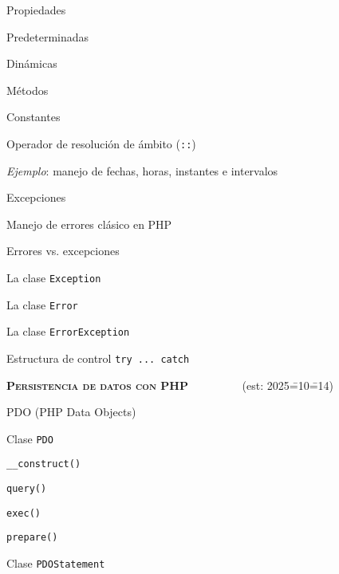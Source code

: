 \begin{longenum}
\begin{longenum}
        \item Propiedades
        \begin{longenum}
            \item Predeterminadas
            \item Dinámicas
        \end{longenum}
        \item Métodos
        \item Constantes
        \begin{longenum}
            \item Operador de resolución de ámbito (\texttt{::})
        \end{longenum}
        \item \textit{Ejemplo}: manejo de fechas, horas, instantes e intervalos
        \item Excepciones
        \begin{longenum}
            \item Manejo de errores clásico en PHP
            \item Errores vs. excepciones
            \item La clase \texttt{Exception}
            \item La clase \texttt{Error}
            \item La clase \texttt{ErrorException}
            \item Estructura de control \texttt{try ... catch}
        \end{longenum}
    \end{longenum}
    \item \textbf{\textsc{Persistencia de datos con PHP}} \ \ \ \ \ \ \ \ \ (est: 2025\==10\==14)
    \begin{longenum}
        \item PDO (PHP Data Objects)
        \begin{longenum}
            \item Clase \texttt{PDO}
            \begin{longenum}
                \item \texttt{\_\_construct()}
                \item \texttt{query()}
                \item \texttt{exec()}
                \item \texttt{prepare()}
            \end{longenum}
            \item Clase \texttt{PDOStatement}

\end{longenum}
\end{longenum}
\end{longenum}
